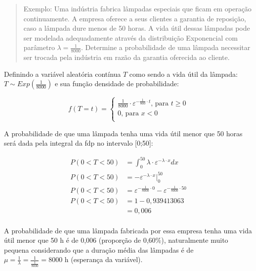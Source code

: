 \documentclass[
]{book}
\begin{document}
\begin{quote}
Exemplo:
Uma indústria fabrica lâmpadas especiais que ficam em operação continuamente. A empresa oferece a seus clientes a garantia de reposição, caso a lâmpada dure menos de 50 horas. A vida útil dessas lâmpadas pode ser modelada adequadamente através da distribuição Exponencial com parâmetro \(\lambda = \frac{1}{8000}\). Determine a probabilidade de uma lâmpada necessitar ser trocada pela indústria em razão da garantia oferecida ao cliente.
\end{quote}

\hfill\break

Definindo a variável aleatória contínua \(T\) como sendo a vida útil da lâmpada: \(T \sim Exp (\frac{1}{8000})\) e sua função densidade de probabilidade:

\hfill\break

\[
f(T=t)=
\begin{cases}
    \frac{1}{8000} \cdot \varepsilon ^{-  \frac{1}{800} \cdot t} \text{, para } t \ge 0 \\
    0 \text{, para } x < 0\\
\end{cases}
\]

\hfill\break

A probabilidade de que uma lâmpada tenha uma vida útil menor que 50 horas será dada pela integral da fdp no intervalo {[}0;50{]}:

\hfill\break

\begin{align*}
P( 0 < T < 50) & = \int_{0}^{50}  \lambda \cdot \varepsilon ^{- \lambda \cdot x} dx \\
P( 0 < T < 50) & = - \varepsilon^{-\lambda \cdot x} \rvert_{0}^{50} \\ 
P( 0 < T < 50) & = \varepsilon^{- \frac{1}{8000}  \cdot 0} - \varepsilon^{- \frac{1}{8000}   \cdot 50} \\
P( 0 < T < 50) & = 1-0,939413063 \\
               & = 0,006 \\
\end{align*}

\hfill\break

A probabilidade de que uma lâmpada fabricada por essa empresa tenha uma vida útil menor que 50 h é de 0,006 (proporção de 0,60\%), naturalmente muito pequena considerando que a duração média das lâmpadas é de \(\mu = \frac{1}{\lambda} =\frac{1}{\frac{1}{8000}}=8000\) h (esperança da variável).
\end{document}
